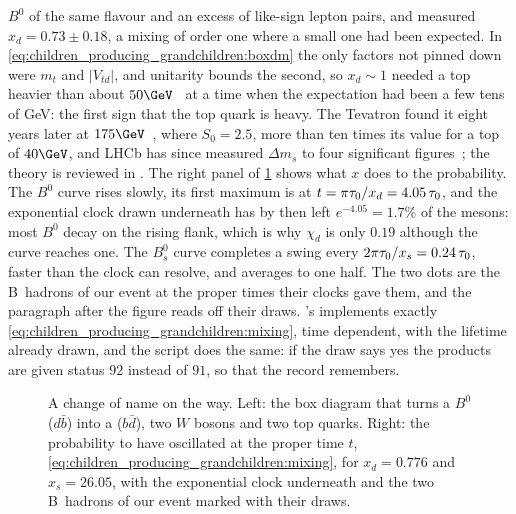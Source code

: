 $B^0$ of the same flavour and an excess of like-sign lepton pairs, and
measured $x_d=0.73\pm0.18$, a mixing of order one where a small one had
been expected. In \cref{eq:children_producing_grandchildren:boxdm} the
only factors not pinned down were $m_t$ and $|V_{td}|$, and unitarity
bounds the second, so $x_d\sim1$ needed a top heavier than about
$50\GeV$~\cite{Ellis:1987bmixing} at a time when the expectation had been
a few tens of GeV: the first sign that the top quark is heavy. The
Tevatron found it eight years later at
$175\GeV$~\cite{CDF:1995wbb,D0:1995jca}, where $S_0=2.5$, more than ten
times its value for a top of $40\GeV$, and LHCb has since measured
$\Delta m_s$ to four significant figures~\cite{LHCb:2021moh}; the theory
is reviewed in \cite{Artuso:2015swg}. The right panel of
\cref{fig:children_producing_grandchildren:mixing_sketch} shows what $x$
does to the probability. The $B^0$ curve rises slowly, its first maximum
is at $t=\pi\tau_0/x_d=4.05\,\tau_0$, and the exponential clock drawn
underneath has by then left $e^{-4.05}=1.7\%$ of the mesons: most $B^0$
decay on the rising flank, which is why $\chi_d$ is only $0.19$ although
the curve reaches one. The $B_s^0$ curve completes a swing every
$2\pi\tau_0/x_s=0.24\,\tau_0$, faster than the clock can resolve, and
averages to one half. The two dots are the B~hadrons of our event at the
proper times their clocks gave them, and the paragraph after the figure
reads off their draws. \PYTHIA's 
implements exactly \cref{eq:children_producing_grandchildren:mixing}, time
dependent, with the lifetime already drawn, and the script does the same:
if the draw says yes the products are given status $92$ instead of $91$,
so that the record remembers.

\begin{figure}[htbp]\centering
\resizebox{\textwidth}{!}{}
\caption[The box diagram and the oscillation probability]{A change of name
on the way. Left: the box diagram that turns a $B^0$ ($d\bar b$) into a
\Bbar ($b\bar d$), two $W$ bosons and two top quarks. Right: the
probability to have oscillated at the proper time $t$,
\cref{eq:children_producing_grandchildren:mixing}, for $x_d=0.776$ and
$x_s=26.05$, with the exponential clock underneath and the two B~hadrons
of our event marked with their draws.}
\label{fig:children_producing_grandchildren:mixing_sketch}
\end{figure}

